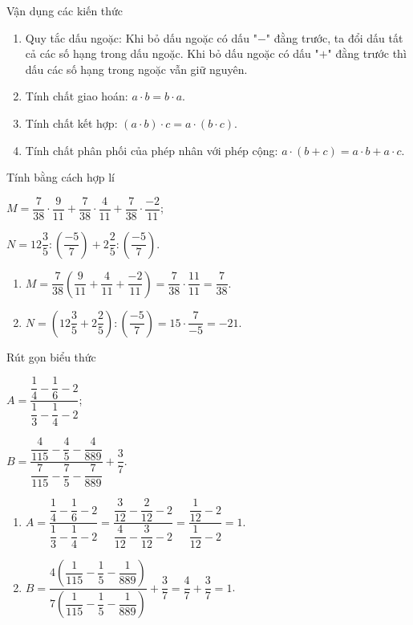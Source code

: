 \begin{dang}
			Vận dụng các kiến thức
	\begin{enumerate}[\tickEX]
		\item Quy tắc dấu ngoặc: Khi bỏ dấu ngoặc có dấu "$-$" đằng trước, ta đổi dấu tất cả các số hạng trong dấu ngoặc. Khi bỏ dấu ngoặc có dấu "$+$" đằng trước thì dấu các số hạng trong ngoặc vẫn giữ nguyên.
		\item Tính chất giao hoán: $a\cdot b=b \cdot a$.
		\item Tính chất kết hợp: $(a \cdot b) \cdot c = a\cdot (b\cdot c)$.
		\item Tính chất phân phối của phép nhân với phép cộng: $a \cdot (b+c) = a \cdot b + a\cdot c$.
	\end{enumerate}
\end{dang}

\begin{vd}
Tính bằng cách hợp lí
	\begin{listEX}[2]
		\item $M= \dfrac{7}{38} \cdot \dfrac{9}{11} + \dfrac{7}{38} \cdot \dfrac{4}{11} + \dfrac{7}{38} \cdot \dfrac{-2}{11}$;
		\item $N= 12 \dfrac{3}{5} : \left( \dfrac{-5}{7}\right) + 2 \dfrac{2}{5} :  \left( \dfrac{-5}{7}\right)$.
	\end{listEX}
	\loigiai
	{\begin{enumerate}
			\item $M= \dfrac{7}{38} \left( \dfrac{9}{11} + \dfrac{4}{11} + \dfrac{-2}{11} \right) = \dfrac{7}{38} \cdot \dfrac{11}{11} = \dfrac{7}{38} $.
			\item $N= \left( 12 \dfrac{3}{5} + 2 \dfrac{2}{5} \right) :\left( \dfrac{-5}{7}\right) = 15 \cdot \dfrac{7}{-5} = -21$.
		\end{enumerate}
	}
\end{vd}
\begin{vd}
Rút gọn biểu thức
	\begin{listEX}[2]
	\item $A= \dfrac{\dfrac{1}{4} - \dfrac{1}{6} -2}{\dfrac{1}{3} - \dfrac{1}{4} -2}$; 
		\item $B= \dfrac{\dfrac{4}{115}-\dfrac{4}{5} -\dfrac{4}{889}}{\dfrac{7}{115}-\dfrac{7}{5} -\dfrac{7}{889}} + \dfrac{3}{7}$. 
	\end{listEX}
	\loigiai
	{\begin{enumerate}
				\item $A= \dfrac{\dfrac{1}{4} - \dfrac{1}{6} -2}{\dfrac{1}{3} - \dfrac{1}{4} -2} =  \dfrac{\dfrac{3}{12} - \dfrac{2}{12} -2}{\dfrac{4}{12} - \dfrac{3}{12} -2} = \dfrac{\dfrac{1}{12}  -2}{\dfrac{1}{12} -2} =1$. 
				\item $B = \dfrac{ 4 \left( \dfrac{1}{115}-\dfrac{1}{5} -\dfrac{1}{889} \right) }{ 7 \left( \dfrac{1}{115}-\dfrac{1}{5} -\dfrac{1}{889}\right) } + \dfrac{3}{7} = \dfrac{4}{7} + \dfrac{3}{7} = 1$.
		\end{enumerate}
	}
\end{vd}

